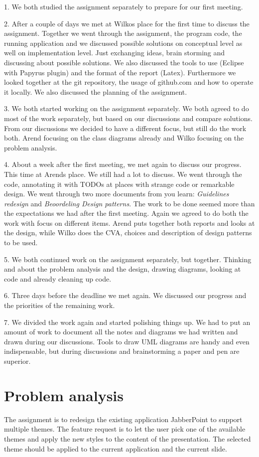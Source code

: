 \documentclass[a4paper]{article}
\begin{document}
1. We both studied the assignment separately to prepare for our first meeting. 

2. After a couple of days we met at Wilkos place for the first time to discuss the assignment. Together we went through the assignment, the program code, the running application and we discussed possible solutions on conceptual level as well on implementation level. Just exchanging ideas, brain storming and discussing about possible solutions. We also discussed the tools to use (Eclipse with Papyrus plugin) and the format of the report (Latex).
Furthermore we looked together at the git repository, the usage of github.com and how to operate it locally. We also discussed the planning of the assignment.  

3. We both started working on the assignment separately. We both agreed to do most of the work separately, but based on our discussions and compare solutions. From our discussions we decided to have a different focus, but still do the work both. Arend focusing on the class diagrams already and Wilko focusing on the problem analysis.

4. About a week after the first meeting, we met again to discuss our progress. This time at Arends place. We still had a lot to discuss. We went through the code, annotating it with TODOs at places with strange code or remarkable design. We went through two more documents from you learn: \textit{Guidelines redesign} and \textit{Beoordeling Design patterns}. The work to be done seemed more than the expectations we had after the first meeting. Again we agreed to do both the work with focus on different items. Arend puts together both reports and looks at the design, while Wilko does the CVA, choices and description of design patterns to be used.

5. We both continued work on the assignment separately, but together. Thinking and about the problem analysis and the design, drawing diagrams, looking at code and already cleaning up code. 

6. Three days before the deadline we met again. We discussed our progress and the priorities of the remaining work. 

7. We divided the work again and started polishing things up. We had to put an amount of work to document all the notes and diagrams we had written and drawn during our discussions. Tools to draw UML diagrams are handy and even indispensable, but during discussions and brainstorming a paper and pen are superior.

\section{Problem analysis}
The assignment is to redesign the existing application JabberPoint to support multiple themes. The feature request is to let the user pick one of the available themes and apply the new styles to the content of the presentation. The selected theme should be applied to the current application and the current slide.
\end{document}
